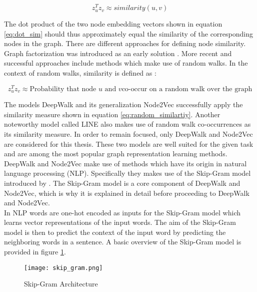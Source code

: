 	\begin{equation}
		z_u^Tz_v \approx similarity(u,v)
		\label{eq:dot_sim}
	\end{equation}

	\noindent The dot product of the two node embedding vectors shown in
	equation \ref{eq:dot_sim} should thus approximately equal the similarity of 
	the corresponding nodes in the graph. There are different approaches for 
	defining node similarity. Graph factorization was introduced as an early 
	solution \citep{ahmed2013distributed}. More recent and successful approaches 
	include methods which make use of random walks. In the context of random 
	walks, similarity is defined as \citep{leskovec2021lecture}:

	\begin{equation}
		z_u^Tz_v \approx \text{Probability that node $u$ and $v$
								co-occur on a random walk over the graph}
	\label{eq:random_similartiy}
	\end{equation}

	\noindent The models DeepWalk \citep{perozzi2014deepwalk} and its 
	generalization Node2Vec \citep{grover2016node2vec} successfully apply the
	similarity measure shown in equation \ref{eq:random_similartiy}. Another 
	noteworthy model called LINE \citep{tang2015line} also makes use of random
	walk co-occurrences as its similarity measure. In order to remain focused,
	only DeepWalk and Node2Vec are considered for this thesis. These two models
	are well suited for the given task and are among the most popular graph
	representation learning methods. \\

	\noindent DeepWalk and Node2Vec make use of methods which have its origin in 
	natural language processing (NLP). Specifically they makes use of the 
	Skip-Gram model introduced by \cite{mikolov2013efficient,mikolov2013distributed}. 
	The Skip-Gram model is a core component of DeepWalk and Node2Vec, which is why 
	it is explained in detail before proceeding to DeepWalk and Node2Vec. \\

	\noindent In NLP words are one-hot encoded as inputs for the Skip-Gram model 
	which learns vector representations of the input words. The aim of the
	Skip-Gram model is then to predict the context of the input word by
	predicting the neighboring words in a sentence. A basic overview of the 
	Skip-Gram model is provided in figure \ref{fig:skip_gram}. 

	\begin{figure}[h]
		\centering
		\texttt{[image: skip\_gram.png]}
		\caption{Skip-Gram Architecture}
		\cite[p. 5]{mikolov2013efficient}
		\label{fig:skip_gram}
	\end{figure}

